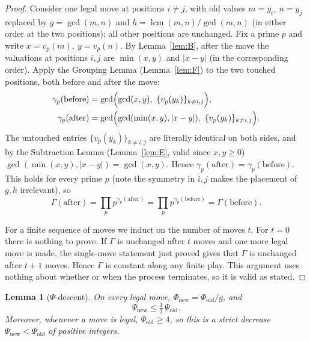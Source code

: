 \documentclass[11pt]{article}
\theoremstyle{plain}
\newtheorem{lemma}{Lemma}
\theoremstyle{definition}
\theoremstyle{remark}
\begin{document}
\begin{proof}
Consider one legal move at positions $i\ne j$, with old values $m=y_i,\
n=y_j$ replaced by $g=\gcd(m,n)$ and $h=\operatorname{lcm}(m,n)/\gcd(m,n)$ (in
either order at the two positions); all other positions are unchanged. Fix a
prime $p$ and write $x=v_p(m),\ y=v_p(n)$. By Lemma~\ref{lem:B}, after the
move the valuations at positions $i,j$ are $\min(x,y)$ and $|x-y|$ (in the
corresponding order). Apply the Grouping Lemma (Lemma~\ref{lem:F}) to the two
touched positions, both before and after the move:
\begin{align*}
\gamma_p(\text{before})&=\gcd\Bigl(\gcd(x,y),\ \{v_p(y_k)\}_{k\ne i,j}\Bigr),\\
\gamma_p(\text{after})&=\gcd\Bigl(\gcd(\min(x,y),|x-y|),\ \{v_p(y_k)\}_{k\ne i,j}\Bigr).
\end{align*}
The untouched entries $\{v_p(y_k)\}_{k\ne i,j}$ are literally identical on both
sides, and by the Subtraction Lemma (Lemma~\ref{lem:E}, valid since
$x,y\ge 0$) $\gcd(\min(x,y),|x-y|)=\gcd(x,y)$. Hence
$\gamma_p(\text{after})= \gamma_p(\text{before})$. This holds for every prime
$p$ (note the symmetry in $i,j$ makes the placement of $g,h$ irrelevant), so
\[
\Gamma(\text{after})=\prod_p p^{\gamma_p(\text{after})}=\prod_p
p^{\gamma_p(\text{before})}=\Gamma(\text{before}).
\]

For a finite sequence of moves we induct on the number of moves $t$. For $t=0$
there is nothing to prove. If $\Gamma$ is unchanged after $t$ moves and one
more legal move is made, the single-move statement just proved gives that
$\Gamma$ is unchanged after $t+1$ moves. Hence $\Gamma$ is constant along any
finite play. This argument uses nothing about whether or when the process
terminates, so it is valid as stated.
\end{proof}

\begin{lemma}[$\Psi$-descent]\label{lem:H}
On every legal move, $\Phi_{\mathrm{new}}=\Phi_{\mathrm{old}}/g$, and
\[
\Psi_{\mathrm{new}}\le\tfrac12\,\Psi_{\mathrm{old}}.
\]
Moreover, whenever a move is legal, $\Psi_{\mathrm{old}}\ge 4$, so this is a
strict decrease $\Psi_{\mathrm{new}}<\Psi_{\mathrm{old}}$ of positive
integers.
\end{lemma}
\end{document}
